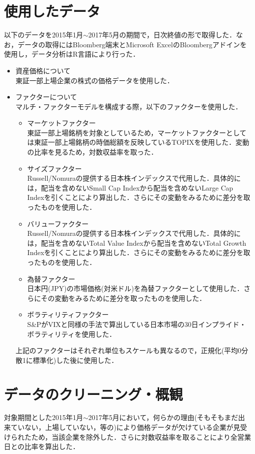 \documentclass[11pt]{jreport}
\begin{document}
\section{使用したデータ}
以下のデータを2015年1月$\sim$2017年5月の期間で，日次終値の形で取得した．なお，データの取得にはBloomberg端末とMicrosoft ExcelのBloombergアドインを使用し，データ分析はR言語により行った．
\begin{itemize}
\item 資産価格について\\
東証一部上場企業の株式の価格データを使用した．
\item ファクターについて\\
マルチ・ファクターモデルを構成する際，以下のファクターを使用した．
\begin{itemize}
\item マーケットファクター\\
東証一部上場銘柄を対象としているため，マーケットファクターとしては東証一部上場銘柄の時価総額を反映しているTOPIXを使用した．変動の比率を見るため，対数収益率を取った．
\item サイズファクター\\
Russell/Nomuraの提供する日本株インデックスで代用した．具体的には，配当を含めないSmall Cap Indexから配当を含めないLarge Cap Indexを引くことにより算出した．さらにその変動をみるために差分を取ったものを使用した．
\item バリューファクター\\
Russell/Nomuraの提供する日本株インデックスで代用した．具体的には，配当を含めないTotal Value Indexから配当を含めないTotal Growth Indexを引くことにより算出した．さらにその変動をみるために差分を取ったものを使用した．
\item 為替ファクター\\
日本円(JPY)の市場価格(対米ドル)を為替ファクターとして使用した．さらにその変動をみるために差分を取ったものを使用した．
\item ボラティリティファクター\\
S\&PがVIXと同様の手法で算出している日本市場の30日インプライド・ボラティリティを使用した．
\end{itemize}
上記のファクターはそれぞれ単位もスケールも異なるので，正規化(平均0分散1に標準化)した後に使用した．
\end{itemize}
\section{データのクリーニング・概観}
対象期間とした2015年1月$\sim$2017年5月において，何らかの理由(そもそもまだ出来ていない，上場していない，等の)により価格データが欠けている企業が見受けられたため，当該企業を除外した．さらに対数収益率を取ることにより全営業日との比率を算出した．
\end{document}
